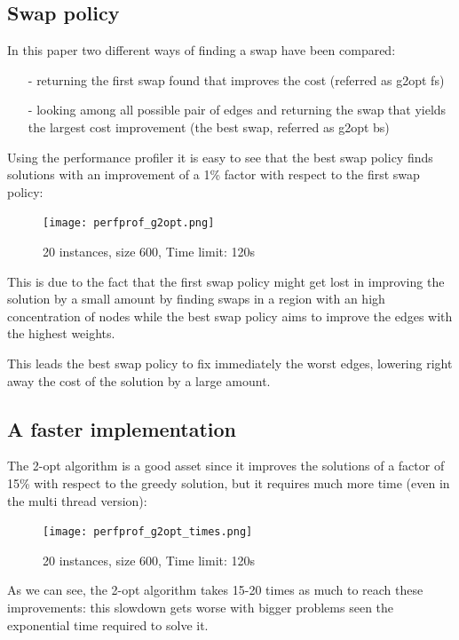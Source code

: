 \subsection{Swap policy}

In this paper two different ways of finding a swap have been compared:

\begin{enumerate}
    \item[-] returning the first swap found that improves the cost (referred as g2opt fs)
    \item[-] looking among all possible pair of edges and returning the swap that yields the largest cost improvement (the best swap, referred as g2opt bs)
\end{enumerate}

Using the performance profiler it is easy to see that the best swap policy finds solutions with an improvement of a 1\% factor with respect to the first swap policy:

\begin{figure}[h]
    \centering
    \texttt{[image: perfprof\_g2opt.png]}
    \caption*{20 instances, size 600, Time limit: 120s}
\end{figure}

This is due to the fact that the first swap policy might get lost in improving the solution by a small amount by finding swaps in a region with an high concentration of nodes while the best swap policy aims to improve the edges with the highest weights.

This leads the best swap policy to fix immediately the worst edges, lowering right away the cost of the solution by a large amount.

\newpage

\subsection{A faster implementation}

The 2-opt algorithm is a good asset since it improves the solutions of a factor of 15\% with respect to the greedy solution, but it requires much more time (even in the multi thread version):
\begin{figure}[h]
    \centering
    \texttt{[image: perfprof\_g2opt\_times.png]}
    \caption*{20 instances, size 600, Time limit: 120s}
\end{figure}

As we can see, the 2-opt algorithm takes 15-20 times as much to reach these improvements: this slowdown gets worse with bigger problems seen the exponential time required to solve it.\\

